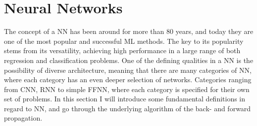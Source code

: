 \section{Neural Networks}\label{sec:NN}
The concept of a \ac{NN} has been around for more than 80 years, and today they are one 
of the most popular and successful \ac{ML} methods. The key to its popularity stems from
its versatility, achieving high performance in a large range of both regression 
and classification problems. One of the defining qualities in a \ac{NN} is the 
possibility of diverse architecture, meaning that there are many
categories of \ac{NN}, where each category has an even deeper selection of
networks. Categories ranging from \ac{CNN}, \ac{RNN} to simple \ac{FFNN}, where each
category is specified for their own set of problems. In this section I will introduce 
some fundamental definitions in regard to \ac{NN}, and go through the underlying 
algorithm of the back- and forward propagation.

